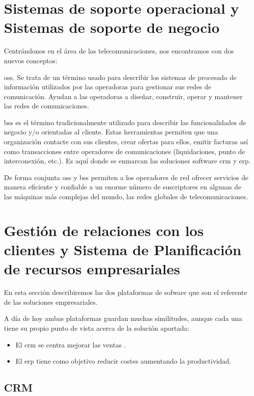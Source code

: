 \section{Sistemas de soporte operacional y Sistemas de soporte de negocio}

Centrándonos en el área de las telecomunicaciones, nos encontramos con dos nuevos conceptos:


\acrfull{oss}. Se trata de un término usado para describir los sistemas de procesado de información utilizados por las operadoras para gestionar sus redes de comunicación. Ayudan a las operadoras a diseñar, construir, operar y mantener las redes de comunicaciones.

\acrfull{bss} es el término tradicionalmente utilizado para describir las funcionalidades de negocio y/o orientadas al cliente. Estas herramientas  permiten que una organización contacte con sus clientes, crear ofertas para ellos, emitir facturas así como transacciones entre operadores de comunicaciones (liquidaciones, punto de interconexión, etc.). Es aquí donde se enmarcan las soluciones software \acrshort{crm} y \acrshort{erp}.

De forma conjunta \acrshort{oss} y \acrshort{bss} permiten a los operadores de red ofrecer servicios de manera eficiente y confiable a un enorme número de suscriptores en algunas de las máquinas más complejas del mundo, las redes globales de telecomunicaciones.




\section{Gestión de relaciones con los clientes y Sistema de Planificación de recursos empresariales}

En esta sección describiremos las dos plataformas de sofware que son el referente de las soluciones empresariales.

A día de hoy ambas plataformas guardan muchas similitudes, aunque cada una tiene su propio punto de vista acerca de la solución aportada:

\begin{itemize}
\item El \acrshort{crm} se centra mejorar las ventas .
\item El \acrshort{erp} tiene como objetivo reducir costes aumentando la productividad.
\end{itemize}



\subsection{CRM}
\label{sub:crm}

